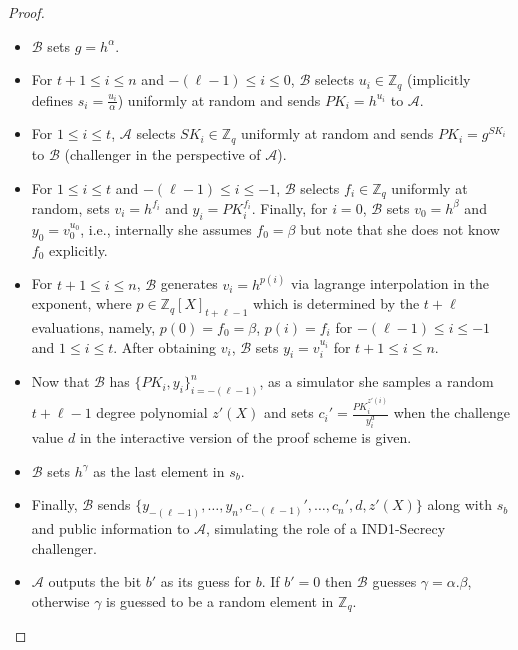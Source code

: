 \begin{proof}
\begin{itemize}
      \begin{itemize}
        \item $\mathcal{B}$ sets $g=h^\alpha$.
        \item For $t+1\leq i\leq n$ and $-(\ell-1)\leq i\leq 0$, $\mathcal{B}$ selects $u_i\in\mathbb{Z}_q$ (implicitly 
          defines $s_i=\frac{u_i}{\alpha}$) uniformly at random and sends 
          $PK_i=h^{u_i}$ to $\mathcal{A}$.
        \item For $1\leq i\leq t$, $\mathcal{A}$ selects $SK_i\in\mathbb{Z}_q$ uniformly at 
          random and sends $PK_i=g^{SK_i}$ to $\mathcal{B}$ (challenger in the perspective of $\mathcal{A}$).
        \item For $1\leq i\leq t$ and $-(\ell-1)\leq i\leq -1$, $\mathcal{B}$ selects $f_i\in\mathbb{Z}_q$ uniformly at random, 
          sets $v_i=h^{f_i}$ and $y_i=PK_i^{f_i}$. Finally, for $i=0$, $\mathcal{B}$ sets $v_0=h^{\beta}$ and 
          $y_0=v_0^{u_0}$, i.e., internally 
          she assumes $f_0=\beta$ but note that she does not know $f_0$ explicitly.\par
        \item For $t+1\leq i\leq n$, $\mathcal{B}$ generates $v_i=h^{p(i)}$ via lagrange interpolation 
          in the exponent, where $p\in\mathbb{Z}_q[X]_{t+\ell-1}$ which is determined by the 
          $t+\ell$ evaluations, namely, $p(0)=f_0=\beta$, $p(i)=f_i$ for 
          $-(\ell-1)\leq i\leq -1$ and $1\leq i\leq t$. After obtaining $v_i$, 
          $\mathcal{B}$ sets $y_i=v_i^{u_i}$ for $t+1\leq i\leq n$.
        \item Now that $\mathcal{B}$ has $\{PK_i,y_i\}_{i=-(\ell-1)}^n$, as a simulator she samples a 
          random $t+\ell-1$ degree polynomial $z'(X)$ and sets $c_i'=\frac{PK_i^{z'(i)}}{y_i^d}$ 
          when the challenge value $d$ in the interactive version of the proof scheme is given.
        \item $\mathcal{B}$ sets $h^\gamma$ as the last element in $s_b$.
        \item Finally, $\mathcal{B}$ sends $\{y_{-(\ell-1)},\dots,y_n,c_{-(\ell-1)}',\dots,c_n',d,z'(X)\}$ 
          along with $s_b$ and public information to $\mathcal{A}$, simulating the role of a 
          IND1-Secrecy challenger.
        \item $\mathcal{A}$ outputs the bit $b'$ as its guess for $b$. If $b'=0$ then 
          $\mathcal{B}$ guesses $\gamma=\alpha.\beta$, otherwise $\gamma$ is guessed to be 
          a random element in $\mathbb{Z}_q$.
      \end{itemize}

  \end{itemize}
\end{proof}

